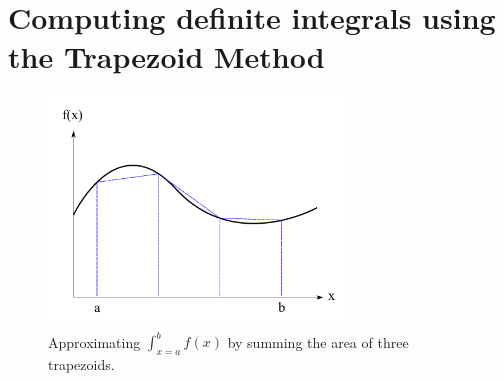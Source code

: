 \documentclass{tmr}
\begin{document}




\section{Computing definite integrals using the Trapezoid Method}

\begin{figure}[t]
\centering
\includegraphics[width=8cm]{integral_diag.pdf}
\caption{Approximating $\int_{x=a}^{b} f(x)$ by summing the area of three trapezoids. }
\end{figure}
\end{document}
